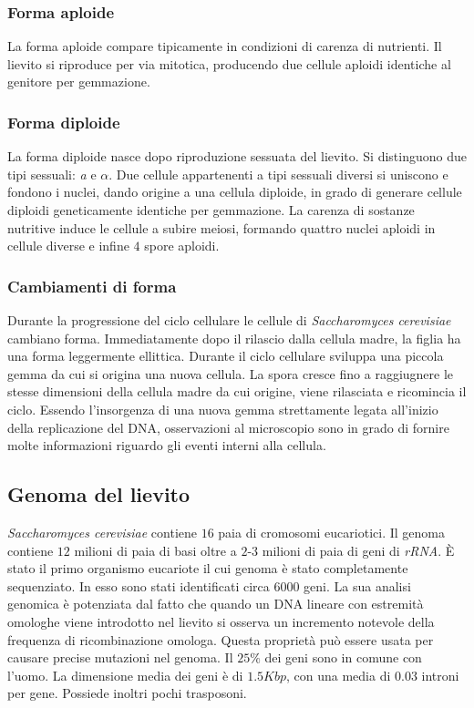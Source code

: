 		\subsubsection*{Forma aploide}
		La forma aploide compare tipicamente in condizioni di carenza di nutrienti.
		Il lievito si riproduce per via mitotica, producendo due cellule aploidi identiche al genitore per gemmazione.

		\subsubsection*{Forma diploide}
		La forma diploide nasce dopo riproduzione sessuata del lievito.
		Si distinguono due tipi sessuali: \emph{a} e \emph{$\alpha$}.
		Due cellule appartenenti a tipi sessuali diversi si uniscono e fondono i nuclei, dando origine a una cellula diploide, in grado di generare cellule diploidi geneticamente identiche per gemmazione.
		La carenza di sostanze nutritive induce le cellule a subire meiosi, formando quattro nuclei aploidi in cellule diverse e infine $4$ spore aploidi.

		\subsubsection*{Cambiamenti di forma}
		Durante la progressione del ciclo cellulare le cellule di \emph{Saccharomyces cerevisiae} cambiano forma.
		Immediatamente dopo il rilascio dalla cellula madre, la figlia ha una forma leggermente ellittica.
		Durante il ciclo cellulare sviluppa una piccola gemma da cui si origina una nuova cellula.
		La spora cresce fino a raggiugnere le stesse dimensioni della cellula madre da cui origine, viene rilasciata e ricomincia il ciclo.
		Essendo l'insorgenza di una nuova gemma strettamente legata all'inizio della replicazione del DNA, osservazioni al microscopio sono in grado di fornire molte informazioni riguardo gli eventi interni alla cellula.
		
	\subsection*{Genoma del lievito}
		\emph{Saccharomyces cerevisiae} contiene $16$ paia di cromosomi eucariotici.
		Il genoma contiene $12$ milioni di paia di basi oltre a $2$-$3$ milioni di paia di geni di \emph{rRNA}.
		\`E stato il primo organismo eucariote il cui genoma \`e stato completamente sequenziato.
		In esso sono stati identificati circa \num{6000} geni.
		La sua analisi genomica \`e potenziata dal fatto che quando un DNA lineare con estremit\`a omologhe viene introdotto nel lievito si osserva un incremento notevole della frequenza di ricombinazione omologa.
		Questa propriet\`a pu\`o essere usata per causare precise mutazioni nel genoma.
		Il $25\%$ dei geni sono in comune con l'uomo.
		La dimensione media dei geni \`e di $1.5Kbp$, con una media di $0.03$ introni per gene.
		Possiede inoltri pochi trasposoni.

